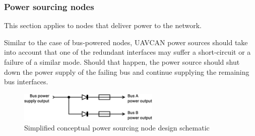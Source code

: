 \subsubsection{Power sourcing nodes}

This section applies to nodes that deliver power to the network.

Similar to the case of bus-powered nodes,
UAVCAN power sources should take into account that one of the redundant interfaces may suffer a
short-circuit or a failure of a similar mode.
Should that happen, the power source should shut down the power supply of the failing bus and continue supplying
the remaining bus interfaces.

\begin{figure}[H]
    \centering
	\includegraphics[width=0.6\textwidth]{physical/redundant_bus_power_source}
	\caption{Simplified conceptual power sourcing node design schematic\label{fig:physical_redundant_bus_power_source}}
\end{figure}
